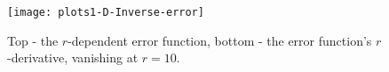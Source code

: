 \documentclass[12pt,twoside]{report}
\begin{document}
\begin{figure}[!htb] 
\begin{center}
\texttt{[image: plots1-D-Inverse-error]}
\end{center}
\caption{Top - the $r$-dependent error function, bottom - the error function's $r$-derivative, vanishing at $r=10$.}


\label{fig:inverseR-1-D-err-and-analytic-dErr}
\end{figure}


\begin{comment}
\section{Illustration of parameter estimation using the regression technique for a 1-D harmonic oscillator Dirichlet problem without friction}
Parameter estimation for problem (\ref{eqns:1_D-time-harmonic-s-E_3-non-dim}) with the coefficients (\ref{eqns:1-D-time-harmonic-E3_s_Atan_coef_1_r}), (\ref{eqns:1-D-time-harmonic-E3_s_Atan_coef_0_r}) and boundary conditions (\ref{eqns:1-D-time-harmonic-z-boundary-source-normalized}), (\ref{eqns:1_D-time-harmonic-traveling-wave-bc-normalized}) is quite involved computationally. In this proposal we shall illustrate the process for the problem

\begin{align}
y''(x) + \omega^2 y(x) =0 \notag\\
y(-a) =A, \qquad y(a) = 0
\end{align}

The main reason for using this problem is that its eigenvalues and eigenfunctions can be easily calculated so that we can readily see the effect of the ill-posedness on the parameter estimation stability.\\
The problem's eigenvalues are $\kappa_k = \dfrac{\pi k}{2}$, $k \in \mathbb{Z}$. \\

\subsection{Relating accuracy to number of sampling points}
We demonstrate the error in recovering $\omega$ when $a$, $A$ are known. Let $\omega = 1$, $a=1$, $A = 1$. Figure \ref{fig:inverseOmega1DvarySPnum} shows the error in estimating $\omega$ as a depending on the number of sampling points in $\log_{10}$ scale. As can be seen from the plot, increase of one order of magnitude in sampling points reduces error in two orders of magnitude.


\end{comment}
\end{document}
